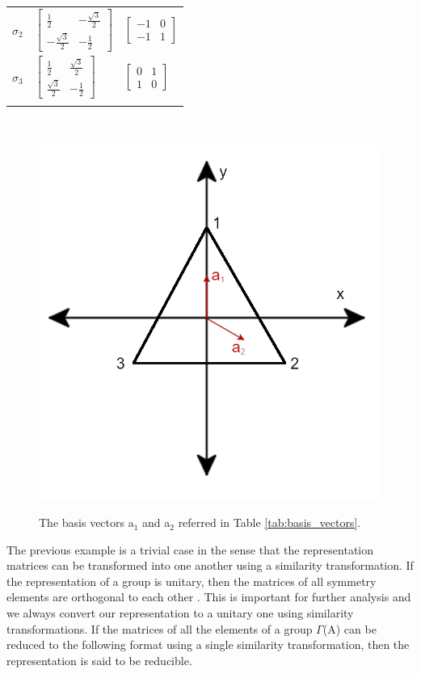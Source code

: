 \documentclass[letterpaper,10pt,doublespacing,edeposit]{uiucthesis2020}
\begin{document}
\begin{mainmatter}
\begin{table}
\begin{tabular}{>{\centering\arraybackslash}p{3.5cm}>{\centering\arraybackslash}p{3.5cm}>{\centering\arraybackslash}p{3.5cm}}
\hline
\addlinespace[1.5ex]
\textbf{$\sigma_2$} & $\begin{bmatrix} \frac{1}{2} & -\frac{\sqrt{3}}{2} \\ -\frac{\sqrt{3}}{2} & -\frac{1}{2} \end{bmatrix}$ & $\begin{bmatrix} -1 & 0 \\ -1 & 1 \end{bmatrix}$ \\
\addlinespace[1.5ex]
\hline
\addlinespace[1.5ex]
\textbf{$\sigma_3$} & $\begin{bmatrix} \frac{1}{2} & \frac{\sqrt{3}}{2} \\ \frac{\sqrt{3}}{2} & -\frac{1}{2} \end{bmatrix}$ & $\begin{bmatrix} 0 & 1 \\ 1 & 0 \end{bmatrix}$ \\
\addlinespace[1.5ex]
\hline\hline
\end{tabular}
~\\
\end{table}

\begin{figure}
\centering\includegraphics[width=0.5\columnwidth]{figures/ch4/equilateral_triangle_basis_vectors.png} \\
\caption{\label{fig:C3v_a1_a2}
The basis vectors a$_1$ and a$_2$ referred in Table \ref{tab:basis_vectors}.
}
\end{figure}

The previous example is a trivial case in the sense that the representation matrices can be transformed into one another using a similarity transformation. If the representation of a group is unitary, then the matrices of all symmetry elements are orthogonal to each other \cite{Koster1956}. This is important for further analysis and we always convert our representation to a unitary one using similarity transformations. If the matrices of all the elements of a group $\Gamma$(A) can be reduced to the following format using a single similarity transformation, then the representation is said to be reducible.


\end{mainmatter}
\end{document}
